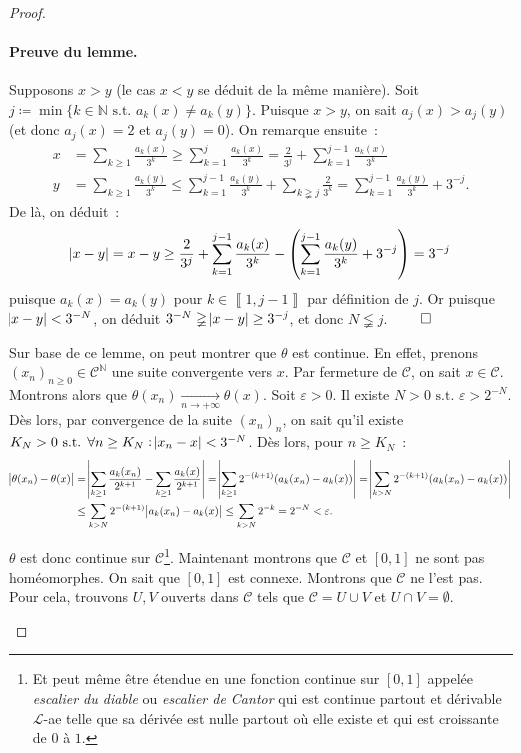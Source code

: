 \documentclass{article}
\newcommand{\pinfty}{{+\infty}}
\newcommand{\st}{\text{ s.t. }}
\newcommand{\N}{{\mathbb N}}
\newcommand{\intint}[2]{\left\llbracket#1, #2\right\rrbracket}
\begin{document}
\begin{proof}
\begin{enumerate}
	\paragraph{Preuve du lemme.} Supposons $x > y$ (le cas $x < y$ se déduit de la même manière). Soit $j \coloneqq \min\{k \in \N \st a_k(x) \neq a_k(y)\}$.
	Puisque $x > y$, on sait $a_j(x) > a_j(y)$ (et donc $a_j(x) = 2$ et $a_j(y) = 0$). On remarque ensuite~:
	\begin{align*}
		x &= \sum_{k \geq 1}\frac {a_k(x)}{3^k} \geq \sum_{k=1}^j\frac {a_k(x)}{3^k} = \frac 2{3^j} + \sum_{k=1}^{j-1}\frac {a_k(x)}{3^k} \\
		y &= \sum_{k \geq 1}\frac {a_k(y)}{3^k} \leq \sum_{k=1}^{j-1}\frac {a_k(y)}{3^k} + \sum_{k \gneqq j}\frac 2{3^k} = \sum_{k=1}^{j-1}\frac {a_k(y)}{3^k} + 3^{-j}.
	\end{align*}
	De là, on déduit~:
	\[\abs {x-y} = x-y \geq \frac 2{3^j} + \sum_{k=1}^{j-1}\frac {a_k(x)}{3^k} - \left(\sum_{k=1}^{j-1}\frac {a_k(y)}{3^k} + 3^{-j}\right) = 3^{-j}\]
	puisque $a_k(x) = a_k(y)$ pour $k \in \intint 1{j-1}$ par définition de $j$. Or puisque $\abs {x-y} < 3^{-N}$, on déduit $3^{-N} \gneqq \abs {x-y} \geq 3^{-j}$,
	et donc $N \lneqq j$. \hfill$\qed$

	\vspace{.5cm}

	Sur base de ce lemme, on peut montrer que $\theta$ est continue. En effet, prenons $(x_n)_{n \geq 0} \in \mathscr C^\N$ une suite convergente vers $x$. Par fermeture
	de $\mathscr C$, on sait $x \in \mathscr C$. Montrons alors que $\theta(x_n) \xrightarrow[n \to \pinfty]{} \theta(x)$. Soit $\varepsilon > 0$. Il existe
	$N > 0 \st \varepsilon > 2^{-N}$. Dès lors, par convergence de la suite $(x_n)_n$, on sait qu'il existe $K_N > 0 \st \forall n \geq K_N : \abs {x_n-x} < 3^{-N}$.
	Dès lors, pour $n \geq K_N$~:
	\begin{align*}
		\abs {\theta(x_n)-\theta(x)} &= \abs {\sum_{k \geq 1}\frac {a_k(x_n)}{2^{k+1}} - \sum_{k \geq 1}\frac {a_k(x)}{2^{k+1}}}
			= \abs {\sum_{k \geq 1}2^{-(k+1)}(a_k(x_n)-a_k(x))} = \abs {\sum_{k > N}2^{-(k+1)}(a_k(x_n)-a_k(x))} \\
		&\leq \sum_{k > N}2^{-(k+1)}\abs {a_k(x_n)-a_k(x)} \leq \sum_{k > N}2^{-k} = 2^{-N} < \varepsilon.
	\end{align*}

	$\theta$ est donc continue sur $\mathscr C$\footnote{Et peut même être étendue en une fonction continue sur $[0, 1]$ appelée \textit{escalier du diable} ou
	\textit{escalier de Cantor} qui est continue partout et dérivable $\mathcal L$-ae telle que sa dérivée est nulle partout où elle existe et qui est croissante
	de $0$ à $1$.}. Maintenant montrons que $\mathscr C$ et $[0, 1]$ ne sont pas homéomorphes. On sait que $[0, 1]$ est connexe. Montrons que $\mathscr C$ ne l'est pas.
	Pour cela, trouvons $U, V$ ouverts dans $\mathscr C$ tels que $\mathscr C = U \cup V$ et $U \cap V = \emptyset$.


\end{enumerate}
\end{proof}
\end{document}
